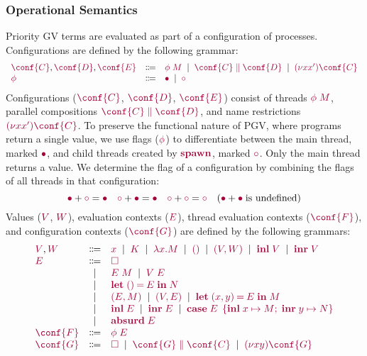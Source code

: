 \documentclass[main.tex]{subfiles}
\begin{document}
\subsubsection*{Operational Semantics}

Priority GV terms are evaluated as part of a configuration of processes. Configurations are defined by the following grammar:
\[
\begin{array}[t]{lcl}
    \tm{\conf{C}}, \tm{\conf{D}}, \tm{\conf{E}}
  & \Coloneqq & \tm{\phi\;M}
    \sep        \tm{\ppar{\conf{C}}{\conf{D}}}
    \sep        \tm{\res{x}{x'}{\conf{C}}}
  \\
  \tm{\phi}
  & \Coloneqq & \tm{\main}
    \sep        \tm{\child}
\end{array}
\]
Configurations ($\tm{\conf{C}}$, $\tm{\conf{D}}$, $\tm{\conf{E}}$) consist of threads $\tm{\phi\;M}$, parallel compositions $\tm{\ppar{\conf{C}}{\conf{D}}}$, and name restrictions $\tm{\res{x}{x'}{\conf{C}}}$. To preserve the functional nature of PGV, where programs return a single value, we use flags ($\tm{\phi}$) to differentiate between the main thread, marked $\tm{\main}$, and child threads created by $\tm{\spawn}$, marked $\tm{\child}$. Only the main thread returns a value. We determine the flag of a configuration by combining the flags of all threads in that configuration:
\[
  \tm{\main}  + \tm{\child} = \tm{\main}
  \quad
  \tm{\child} + \tm{\main}  = \tm{\main}
  \quad
  \tm{\child} + \tm{\child} = \tm{\child}
  \quad
  (\tm{\main}  + \tm{\main} \; \text{is undefined})
\]
Values ($\tm{V}$, $\tm{W}$), evaluation contexts ($\tm{E}$), thread evaluation contexts ($\tm{\conf{F}}$), and configuration contexts ($\tm{\conf{G}}$) are defined by the following grammars:
\[
\begin{array}[t]{lcl}
  \tm{V}, \tm{W}
  & \Coloneqq & \tm{x}
    \sep        \tm{K}
    \sep        \tm{\lambda x.M}
    \sep        \tm{\unit}
    \sep        \tm{\pair{V}{W}}
    \sep        \tm{\inl{V}}
    \sep        \tm{\inr{V}}
  \\
  \tm{E}
  & \Coloneqq & \tm{\hole} \\
  & \sep      & \tm{E\;M}
    \sep        \tm{V\;E} \\
  & \sep      & \tm{\letunit{E}{N}} \\
  & \sep      & \tm{\pair{E}{M}}
    \sep        \tm{\pair{V}{E}}
    \sep        \tm{\letpair{x}{y}{E}{M}} \\
  & \sep      & \tm{\inl{E}}
    \sep        \tm{\inr{E}}
    \sep        \tm{\casesum{E}{x}{M}{y}{N}} \\
  & \sep      & \tm{\absurd{E}}
  \\
  \tm{\conf{F}}
  & \Coloneqq & \tm{\phi\;E}
  \\
  \tm{\conf{G}}
  & \Coloneqq & \tm{\hole}
    \sep        \tm{\ppar{\conf{G}}{\conf{C}}}
    \sep        \tm{\res{x}{y}{\conf{G}}}
\end{array}
\]
\end{document}
